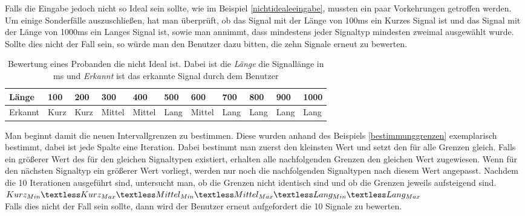 Falls die Eingabe jedoch nicht so Ideal sein sollte, wie im Beispiel \autoref{nichtidealeeingabe}, mussten ein paar Vorkehrungen getroffen werden. Um einige Sonderf{\"a}lle auszuschlie{\ss}en, hat man {\"u}berpr{\"u}ft, ob das Signal mit der L{\"a}nge von 100ms ein Kurzes Signal ist und das Signal mit der L{\"a}nge von 1000ms ein Langes Signal ist, sowie man annimmt, dass mindestens jeder Signaltyp mindesten zweimal ausgew{\"a}hlt wurde. Sollte dies nicht der Fall sein, so w{\"u}rde man den Benutzer dazu bitten, die zehn Signale erneut zu bewerten. 

\begin{table}[]
\centering
\caption{Bewertung eines Probanden die nicht Ideal ist. Dabei ist die \textit{L{\"a}nge} die Signall{\"a}nge in ms und \textit{Erkannt} ist das erkannte Signal durch dem Benutzer}
\label{nichtidealeeingabe}
\begin{tabular}{l|l|l|l|l|l|l|l|l|l|l}
 L{\"a}nge & 100 & 200 & 300 & 400 & 500 & 600 & 700 & 800 & 900 & 1000 \\ \hline
 Erkannt & Kurz & Kurz & Mittel & Mittel & Lang & Mittel & Lang & Lang & Lang & Lang \\ %
\end{tabular}
\end{table}

Man beginnt damit die neuen Intervallgrenzen zu bestimmen. Diese wurden anhand des Beispiels \autoref{bestimmunggrenzen} exemplarisch bestimmt, dabei ist jede Spalte eine Iteration. Dabei bestimmt man zuerst den kleinsten Wert und setzt den f{\"u}r alle Grenzen gleich. Falls ein gr{\"o}{\ss}erer Wert des f{\"u}r den gleichen Signaltypen existiert, erhalten alle nachfolgenden Grenzen den gleichen Wert zugewiesen. Wenn f{\"u}r den n{\"a}chsten Signaltyp ein gr{\"o}{\ss}erer Wert vorliegt, werden nur noch die nachfolgenden Signaltypen nach diesem Wert angepasst. Nachdem die 10 Iterationen ausgef{\"u}hrt sind, untersucht man, ob die Grenzen nicht identisch sind und ob die Grenzen jeweils aufsteigend sind. \\

$Kurz_{Min} \textless Kurz_{Max} \textless Mittel_{Min} \textless Mittel_{Max} \textless Lang_{Min} \textless Lang_{Max}$ \\

Falls dies nicht der Fall sein sollte, dann wird der Benutzer erneut aufgefordert die 10 Signale zu bewerten.

